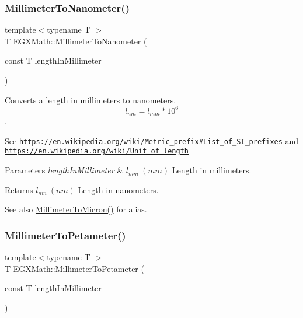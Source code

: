 \subsubsection{\texorpdfstring{Millimeter\+To\+Nanometer()}{MillimeterToNanometer()}}
{\footnotesize\ttfamily template$<$typename T $>$ \\
T E\+G\+X\+Math\+::\+Millimeter\+To\+Nanometer (\begin{DoxyParamCaption}\item[{const T}]{length\+In\+Millimeter }\end{DoxyParamCaption})}



Converts a length in millimeters to nanometers. \[ l_{nm}=l_{mm} * 10^{6} \]. 

See \href{https://en.wikipedia.org/wiki/Metric_prefix#List_of_SI_prefixes}{\tt https\+://en.\+wikipedia.\+org/wiki/\+Metric\+\_\+prefix\#\+List\+\_\+of\+\_\+\+S\+I\+\_\+prefixes} and \href{https://en.wikipedia.org/wiki/Unit_of_length}{\tt https\+://en.\+wikipedia.\+org/wiki/\+Unit\+\_\+of\+\_\+length} 
\begin{DoxyParams}{Parameters}
{\em length\+In\+Millimeter} & $ l_{mm}\ (mm)$ Length in millimeters. \\
\hline
\end{DoxyParams}
\begin{DoxyReturn}{Returns}
$ l_{nm}\ (nm)$ Length in nanometers. 
\end{DoxyReturn}
\begin{DoxySeeAlso}{See also}
\mbox{\hyperlink{group___e_g_x_math-_conversions-_length_conversions-_s_i-_millimeter-_non-_s_i_ga47eac74d2eeec20afc801e61d53f67a0}{Millimeter\+To\+Micron()}} for alias. 
\end{DoxySeeAlso}
\mbox{\label{group___e_g_x_math-_conversions-_length_conversions-_s_i-_millimeter-_s_i_ga02c5ee4941d1915c4d6d2b96788bb89f}} 
\subsubsection{\texorpdfstring{Millimeter\+To\+Petameter()}{MillimeterToPetameter()}}
{\footnotesize\ttfamily template$<$typename T $>$ \\
T E\+G\+X\+Math\+::\+Millimeter\+To\+Petameter (\begin{DoxyParamCaption}\item[{const T}]{length\+In\+Millimeter }\end{DoxyParamCaption})}



